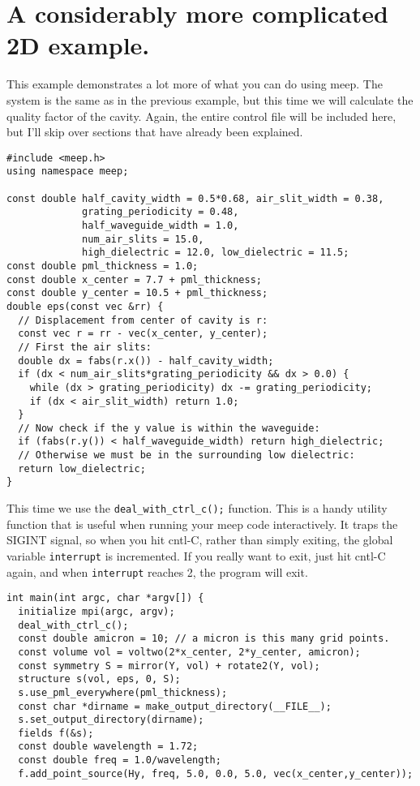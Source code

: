 \begin{comment}
/*
\end{comment}
\section{A considerably more complicated 2D example.}
\begin{comment}
*/
\end{comment}

This example demonstrates a lot more of what you can do using meep.  The
system is the same as in the previous example, but this time we will
calculate the quality factor of the cavity.  Again, the entire control file
will be included here, but I'll skip over sections that have already been
explained.

\begin{verbatim}
#include <meep.h>
using namespace meep;

const double half_cavity_width = 0.5*0.68, air_slit_width = 0.38,
             grating_periodicity = 0.48,
             half_waveguide_width = 1.0,
             num_air_slits = 15.0,
             high_dielectric = 12.0, low_dielectric = 11.5;
const double pml_thickness = 1.0;
const double x_center = 7.7 + pml_thickness;
const double y_center = 10.5 + pml_thickness;
double eps(const vec &rr) {
  // Displacement from center of cavity is r:
  const vec r = rr - vec(x_center, y_center);
  // First the air slits:
  double dx = fabs(r.x()) - half_cavity_width;
  if (dx < num_air_slits*grating_periodicity && dx > 0.0) {
    while (dx > grating_periodicity) dx -= grating_periodicity;
    if (dx < air_slit_width) return 1.0;
  }
  // Now check if the y value is within the waveguide:
  if (fabs(r.y()) < half_waveguide_width) return high_dielectric;
  // Otherwise we must be in the surrounding low dielectric:
  return low_dielectric;
}
\end{verbatim}
This time we use the \verb!deal_with_ctrl_c();! function.  This is a handy
utility function that is useful when running your meep code
interactively.  It traps the SIGINT signal, so when you hit cntl-C, rather
than simply exiting, the global variable \verb!interrupt! is incremented.
If you really want to exit, just hit cntl-C again, and when
\verb!interrupt! reaches 2, the program will exit.
\begin{verbatim}
int main(int argc, char *argv[]) {
  initialize mpi(argc, argv);
  deal_with_ctrl_c();
  const double amicron = 10; // a micron is this many grid points.
  const volume vol = voltwo(2*x_center, 2*y_center, amicron);
  const symmetry S = mirror(Y, vol) + rotate2(Y, vol);
  structure s(vol, eps, 0, S);
  s.use_pml_everywhere(pml_thickness);
  const char *dirname = make_output_directory(__FILE__);
  s.set_output_directory(dirname);
  fields f(&s);
  const double wavelength = 1.72;
  const double freq = 1.0/wavelength;
  f.add_point_source(Hy, freq, 5.0, 0.0, 5.0, vec(x_center,y_center));
\end{verbatim}
